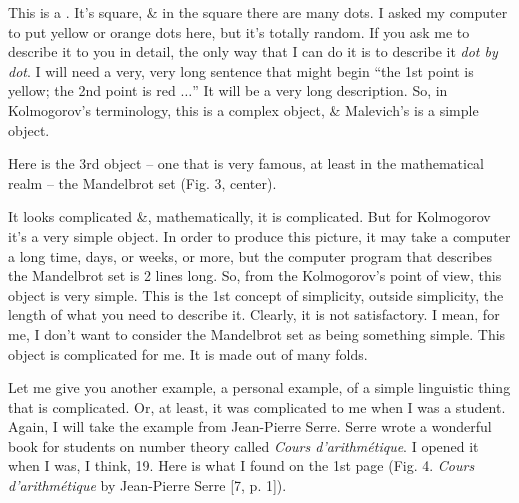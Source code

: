 \documentclass[oneside]{book}
\numberwithin{equation}{section}
\begin{document}
This is a . It's square, \& in the square there are many dots. I asked my computer to put yellow or orange dots here, but it's totally random. If you ask me to describe it to you in detail, the only way that I can do it is to describe it \textit{dot by dot}. I will need a very, very long sentence that might begin ``the 1st point is yellow; the 2nd point is red $\ldots$'' It will be a very long description. So, in Kolmogorov's terminology, this is a complex object, \& Malevich's is a simple object.

Here is the 3rd object -- one that is very famous, at least in the mathematical realm -- the Mandelbrot set (Fig. 3, center).

It looks complicated \&, mathematically, it is complicated. But for Kolmogorov it's a very simple object. In order to produce this picture, it may take a computer a long time, days, or weeks, or more, but the computer program that describes the Mandelbrot set is 2 lines long. So, from the Kolmogorov's point of view, this object is very simple. This is the 1st concept of simplicity, outside simplicity, the length of what you need to describe it. Clearly, it is not satisfactory. I mean, for me, I don't want to consider the Mandelbrot set as being something simple. This object is complicated for me. It is made out of many folds.

Let me give you another example, a personal example, of a simple linguistic thing that is complicated. Or, at least, it was complicated to me when I was a student. Again, I will take the example from Jean-Pierre Serre. Serre wrote a wonderful book for students on number theory called \textit{Cours d'arithm\'etique}. I opened it when I was, I think, 19. Here is what I found on the 1st page (\textsf{Fig. 4. \textit{Cours d'arithm\'etique} by Jean-Pierre Serre [7, p. 1]}).
\end{document}
